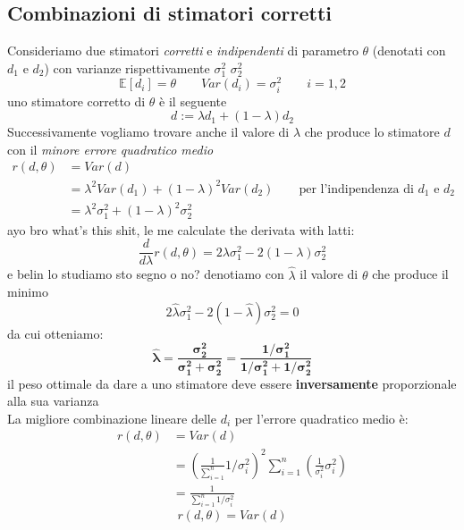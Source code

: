 \documentclass[]{article}
\newcommand{\ev}{\mathbb{E}[X]}
\renewcommand{\ev}[1]{\mathbb{E}\left[#1\right]}
\begin{document}
    \subsection{Combinazioni di stimatori corretti}
    Consideriamo due stimatori \textit{corretti} e \textit{indipendenti} di parametro $\theta$ (denotati con $d_1$ e $d_2$) con varianze rispettivamente $\sigma^2_1$ $\sigma^2_2$
    \[ \ev{d_i} = \theta \qquad Var(d_i) = \sigma^2_i \qquad i=1,2  \]
    uno stimatore corretto di $\theta$ è il seguente
    \[ d := \lambda d_1 + (1- \lambda) d_2 \]
    Successivamente vogliamo trovare anche il valore di $\lambda$ che produce lo stimatore $d$ con il \textit{minore errore quadratico medio}
    \begin{equation*}
        \begin{split}
            r(d, \theta) &= Var(d) \\
            &= \lambda^2 Var(d_1) + (1- \lambda)^2 Var(d_2) \qquad \text{per l'indipendenza di $d_1$ e $d_2$} \\
            &= \lambda^2 \sigma^2_1 + (1-\lambda)^2 \sigma^2_2
        \end{split}
    \end{equation*}
    ayo bro what's this shit, le me calculate the derivata with latti:
    \[ \frac{d}{d \lambda} r(d, \theta) = 2 \lambda \sigma^2_1 - 2(1- \lambda) \sigma^2_2 \]
    e belin lo studiamo sto segno o no? denotiamo con $\hat{\lambda}$ il valore di $\theta$ che produce il minimo
    \[ 2 \hat{\lambda} \sigma^2_1 - 2(1- \hat{\lambda}) \sigma^2_2 = 0 \]
    da cui otteniamo:
    \[ \boldsymbol{\hat{\lambda} = \frac{\sigma^2_2}{\sigma^2_1 + \sigma^2_2} = \frac{1 / \sigma^2_1}{1 / \sigma^2_1 + 1 / \sigma^2_2}} \]
    il peso ottimale da dare a uno stimatore deve essere \textbf{inversamente} proporzionale alla sua varianza \\
    La migliore combinazione lineare delle $d_i$ per l'errore quadratico medio è:
    \begin{equation*}
        \begin{split}
            r(d, \theta) &= Var(d) \\
            &= \left( \frac{1}{\sum_{i=1}^{n}} 1 / \sigma^2_i \right)^2 \sum_{i=1}^{n} \left( \frac{1}{\sigma^2_i} \sigma^2_i \right) \\
            &= \frac{1}{\sum_{i=1}^{n} 1 / \sigma^2_i}
        \end{split}
    \end{equation*}
    \[ r(d, \theta) = Var(d) \]
\end{document}
